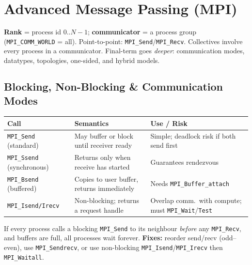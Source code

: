\documentclass[11pt,a4paper]{article}
\begin{document}
\section{Advanced Message Passing (MPI)}

\begin{conceptbox}
\textbf{Rank} = process id $0..N{-}1$; \textbf{communicator} = a process group (\texttt{MPI\_COMM\_WORLD} = all). Point-to-point: \texttt{MPI\_Send}/\texttt{MPI\_Recv}. Collectives involve every process in a communicator. Final-term goes \emph{deeper}: communication modes, datatypes, topologies, one-sided, and hybrid models.
\end{conceptbox}

\subsection{Blocking, Non-Blocking \& Communication Modes}
\begin{longtable}{@{}p{3.6cm}p{4.8cm}p{5.4cm}@{}}
\toprule
\rowcolor{primary!15}
\textbf{Call} & \textbf{Semantics} & \textbf{Use / Risk} \\
\midrule
\endhead
\texttt{MPI\_Send} (standard) & May buffer or block until receiver ready & Simple; deadlock risk if both send first \\
\texttt{MPI\_Ssend} (synchronous) & Returns only when receive has started & Guarantees rendezvous \\
\texttt{MPI\_Bsend} (buffered) & Copies to user buffer, returns immediately & Needs \texttt{MPI\_Buffer\_attach} \\
\texttt{MPI\_Isend/Irecv} & Non-blocking; returns a request handle & Overlap comm.\ with compute; must \texttt{MPI\_Wait}/\texttt{Test} \\
\bottomrule
\end{longtable}

\begin{alertbox}
If every process calls a blocking \texttt{MPI\_Send} to its neighbour \emph{before} any \texttt{MPI\_Recv}, and buffers are full, all processes wait forever. \textbf{Fixes:} reorder send/recv (odd--even), use \texttt{MPI\_Sendrecv}, or use non-blocking \texttt{MPI\_Isend}/\texttt{MPI\_Irecv} then \texttt{MPI\_Waitall}.
\end{alertbox}
\end{document}
